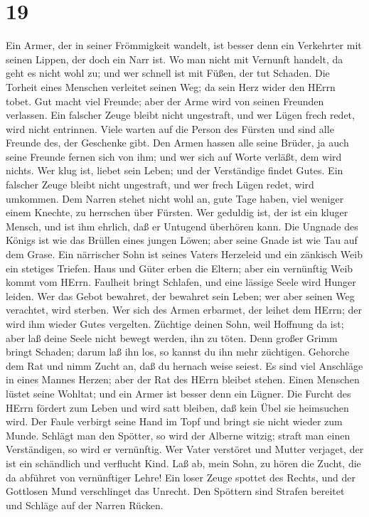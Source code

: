 \hypertarget{section-18}{%
\section{19}\label{section-18}}

 Ein Armer, der in seiner Frömmigkeit wandelt, ist besser
denn ein Verkehrter mit seinen Lippen, der doch ein Narr ist.
 Wo man nicht mit Vernunft handelt, da geht es nicht wohl
zu; und wer schnell ist mit Füßen, der tut Schaden.  Die
Torheit eines Menschen verleitet seinen Weg; da sein Herz wider den
HErrn tobet.  Gut macht viel Freunde; aber der Arme wird von
seinen Freunden verlassen.  Ein falscher Zeuge bleibt nicht
ungestraft, und wer Lügen frech redet, wird nicht entrinnen.
 Viele warten auf die Person des Fürsten und sind alle
Freunde des, der Geschenke gibt.  Den Armen hassen alle
seine Brüder, ja auch seine Freunde fernen sich von ihm; und wer sich
auf Worte verläßt, dem wird nichts.  Wer klug ist, liebet
sein Leben; und der Verständige findet Gutes.  Ein falscher
Zeuge bleibt nicht ungestraft, und wer frech Lügen redet, wird umkommen.
 Dem Narren stehet nicht wohl an, gute Tage haben, viel
weniger einem Knechte, zu herrschen über Fürsten.  Wer
geduldig ist, der ist ein kluger Mensch, und ist ihm ehrlich, daß er
Untugend überhören kann.  Die Ungnade des Königs ist wie
das Brüllen eines jungen Löwen; aber seine Gnade ist wie Tau auf dem
Grase.  Ein närrischer Sohn ist seines Vaters Herzeleid und
ein zänkisch Weib ein stetiges Triefen.  Haus und Güter
erben die Eltern; aber ein vernünftig Weib kommt vom HErrn.
 Faulheit bringt Schlafen, und eine lässige Seele wird
Hunger leiden.  Wer das Gebot bewahret, der bewahret sein
Leben; wer aber seinen Weg verachtet, wird sterben.  Wer
sich des Armen erbarmet, der leihet dem HErrn; der wird ihm wieder Gutes
vergelten.  Züchtige deinen Sohn, weil Hoffnung da ist;
aber laß deine Seele nicht bewegt werden, ihn zu töten. 
Denn großer Grimm bringt Schaden; darum laß ihn los, so kannst du ihn
mehr züchtigen.  Gehorche dem Rat und nimm Zucht an, daß du
hernach weise seiest.  Es sind viel Anschläge in eines
Mannes Herzen; aber der Rat des HErrn bleibet stehen. 
Einen Menschen lüstet seine Wohltat; und ein Armer ist besser denn ein
Lügner.  Die Furcht des HErrn fördert zum Leben und wird
satt bleiben, daß kein Übel sie heimsuchen wird.  Der Faule
verbirgt seine Hand im Topf und bringt sie nicht wieder zum Munde.
 Schlägt man den Spötter, so wird der Alberne witzig;
straft man einen Verständigen, so wird er vernünftig.  Wer
Vater verstöret und Mutter verjaget, der ist ein schändlich und
verflucht Kind.  Laß ab, mein Sohn, zu hören die Zucht, die
da abführet von vernünftiger Lehre!  Ein loser Zeuge
spottet des Rechts, und der Gottlosen Mund verschlinget das Unrecht.
 Den Spöttern sind Strafen bereitet und Schläge auf der
Narren Rücken.

